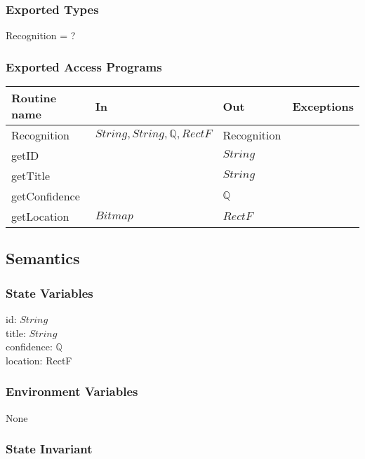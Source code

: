 \documentclass[12pt, titlepage]{article}
\begin{document}
\subsubsection* {Exported Types}

Recognition = ?

\subsubsection* {Exported Access Programs}

\begin{tabular}{| l | l | l | l |}
\hline
\textbf{Routine name} & \textbf{In} & \textbf{Out} & \textbf{Exceptions}\\
\hline
Recognition &$ String, String, \mathbb{Q}, RectF $ &  Recognition & \\
\hline
getID &$  $ & $String$ & \\
\hline
getTitle &$ $ & $String$ & \\
\hline
getConfidence &$  $ & $\mathbb{Q}$ & \\
\hline
getLocation &$ Bitmap $ & $RectF$ & \\
\hline
\end{tabular}

\subsection* {Semantics}

\subsubsection* {State Variables}

id: $String$  \\ 
title: $String$ \\
confidence: $\mathbb{Q}$ \\
location: RectF \\

\subsubsection* {Environment Variables}

None

\subsubsection* {State Invariant}
\end{document}
